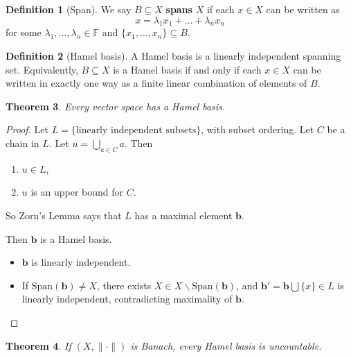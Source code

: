 \documentclass[justified]{tufte-book}
\theoremstyle{plain}%
\newtheorem{thm}{Theorem}[chapter]
\theoremstyle{definition}
\newtheorem{defn}[thm]{Definition}
\theoremstyle{remark}
\newcommand{\F}{\mathbb{F}}
\begin{document}
  \begin{defn}[Span]
      We say $B \subseteq X$ \textbf{spans} $X$ if each $x \in X$ can be written as \[
          x = \lambda_1 x_1 + \dots + \lambda_n x_n
      \] for some $\lambda_1, \dots, \lambda_n \in \F$ and $\{ x_1, \dots, x_n \} \subseteq B$. 
  \end{defn}
  
  \begin{defn}[Hamel basis]
      A Hamel basis is a linearly independent spanning set. Equivalently, $B \subseteq X$ is a Hamel basis if and only if each $x \in X$ can be written in exactly one way as a finite linear combination of elements of $B$.
  \end{defn}
  
  \begin{thm}
      Every vector space has a Hamel basis.
  \end{thm}
  
  \begin{proof}
      Let $L = \{ \text{linearly independent subsets} \}$, with subset ordering.  Let $C$ be a chain in $L$.  Let $u = \bigcup_{a \in C} a$.  Then 
      \begin{enumerate}[(1)]
          \item $u \in L$,
          \item $u$ is an upper bound for $C$.
      \end{enumerate}  
      So Zorn's Lemma says that $L$ has a maximal element $\mathbf{b}$.  
      
      Then $\mathbf{b}$ is a Hamel basis. 
      \begin{itemize}
          \item $\mathbf{b}$ is linearly independent.  
          \item If $\text{Span}(\mathbf{b}) \neq X$, there exists $X \in X \backslash \text{Span}(\mathbf{b})$, and $\mathbf{b'} = \mathbf{b} \bigcup \{ x \} \in L$ is linearly independent, contradicting maximality of $\mathbf{b}$. \qedhere
      \end{itemize}  
  \end{proof}
  
  \begin{thm}
      If $(X, \| \cdot \| )$ is Banach, every Hamel basis is uncountable.
  \end{thm}


\end{document}
